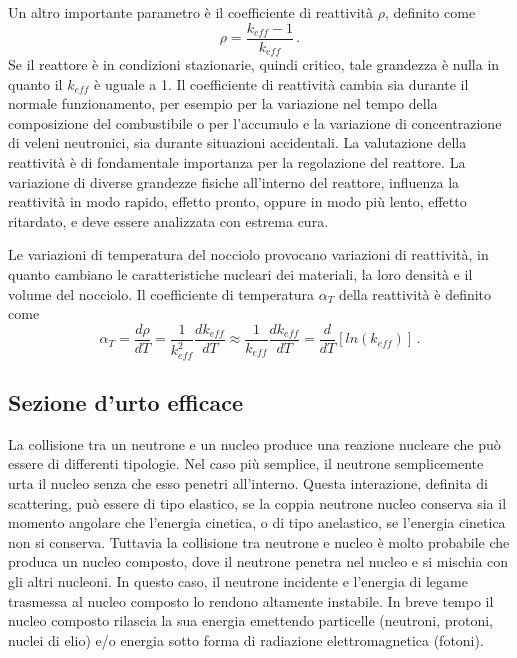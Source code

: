 Un altro importante parametro è il coefficiente di reattività $\rho$, definito 
come 
\begin{equation}
\rho=\frac{k_{eff}-1}{k_{eff}} \,.
\end{equation}
Se il reattore è in condizioni stazionarie, quindi critico, tale grandezza è 
nulla in quanto il $k_{eff}$ è uguale a 1.
Il coefficiente di reattività cambia sia durante il normale funzionamento, per 
esempio per la variazione nel tempo della composizione del combustibile o per 
l'accumulo e la variazione di concentrazione di veleni neutronici, sia durante situazioni 
accidentali. 
La valutazione della reattività è di fondamentale importanza per la regolazione 
del reattore.
La variazione di diverse grandezze fisiche all'interno del reattore, influenza 
la reattività in modo rapido, effetto pronto, oppure in modo più lento, effetto 
ritardato, e deve essere analizzata con estrema cura. \cite{impnc}

Le variazioni di temperatura del nocciolo provocano variazioni di reattività, 
in 
quanto cambiano le caratteristiche nucleari dei materiali, la loro densità e il 
volume del nocciolo.
Il coefficiente di temperatura $\alpha_T$ della reattività è definito come 
\begin{equation}
\label{coeff_di_temp}
\alpha_T=\frac{d\rho}{dT}=\frac{1}{k_{eff}^2}\frac{d k_{eff}}{dT}\approx 
\frac{1}{k_{eff}}\frac{d k_{eff}}{dT}  = \frac{d}{dT}[ln(k_{eff})] \,.
\end{equation}

\subsection{Sezione d'urto efficace}
La collisione tra un neutrone e un nucleo produce una reazione nucleare che può 
essere di differenti tipologie. 
Nel caso più semplice, il neutrone semplicemente urta il nucleo senza che esso 
penetri all'interno. Questa interazione, definita di scattering, può essere di 
tipo elastico, se la coppia  neutrone nucleo conserva 
sia 
il momento angolare che l'energia cinetica, o di tipo anelastico, se l'energia cinetica
non si conserva.
Tuttavia la collisione tra neutrone e nucleo è molto probabile che produca un 
nucleo composto, dove il neutrone penetra nel nucleo e si mischia con gli altri 
nucleoni. In questo caso, il neutrone incidente e l'energia di legame 
trasmessa al nucleo composto lo rendono altamente instabile.
In breve tempo il nucleo composto rilascia la sua energia emettendo particelle 
(neutroni, protoni, nuclei di elio) e/o energia sotto forma di radiazione 
elettromagnetica (fotoni).

